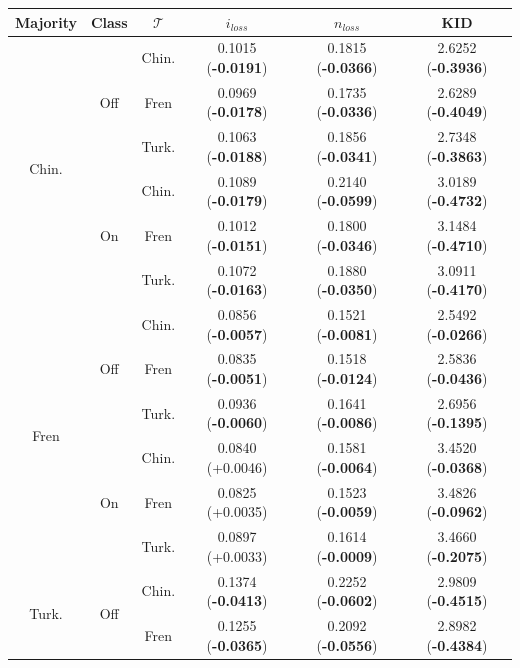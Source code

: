%
%
\begin{table}[]
\centering
\begin{tabular}{c|c|c|c|c|c}
    \textbf{Majority} & \textbf{Class} & \textbf{$\mathcal{T}$} & \textbf{$i_{loss}$} & \textbf{$n_{loss}$} & \textbf{KID} \\
    \toprule
\multirow{6}{*}{Chin.} & \multirow{3}{*}{Off} & Chin.    & 0.1015 (\textbf{-0.0191})       & 0.1815 (\textbf{-0.0366})       & 2.6252 (\textbf{-0.3936})  \\
 &  &Fren     & 0.0969 (\textbf{-0.0178})       & 0.1735 (\textbf{-0.0336})       & 2.6289 (\textbf{-0.4049})   \\
 &  & Turk.    & 0.1063 (\textbf{-0.0188})       & 0.1856 (\textbf{-0.0341})       & 2.7348 (\textbf{-0.3863}) \\
\hhline{~-----}
 & \multirow{3}{*}{On} &Chin.    & 0.1089 (\textbf{-0.0179})       & 0.2140 (\textbf{-0.0599})       & 3.0189 (\textbf{-0.4732}) \\
 &  & Fren     & 0.1012 (\textbf{-0.0151})       & 0.1800 (\textbf{-0.0346})       & 3.1484 (\textbf{-0.4710})  \\
 &  & Turk.    & 0.1072 (\textbf{-0.0163})       & 0.1880 (\textbf{-0.0350})       & 3.0911 (\textbf{-0.4170}) \\
\midrule
\multirow{6}{*}{Fren} & \multirow{3}{*}{Off} & Chin.    & 0.0856 (\textbf{-0.0057})       & 0.1521 (\textbf{-0.0081})       & 2.5492 (\textbf{-0.0266})  \\
 &  & Fren     & 0.0835 (\textbf{-0.0051})       & 0.1518 (\textbf{-0.0124})       & 2.5836 (\textbf{-0.0436})   \\
 &  & Turk.    & 0.0936 (\textbf{-0.0060})       & 0.1641 (\textbf{-0.0086})       & 2.6956 (\textbf{-0.1395})    \\
\hhline{~-----}
 & \multirow{3}{*}{On} & Chin.    & 0.0840 (+0.0046)       & 0.1581 (\textbf{-0.0064})       & 3.4520 (\textbf{-0.0368})  \\
 &  & Fren     & 0.0825 (+0.0035)       & 0.1523 (\textbf{-0.0059})       & 3.4826 (\textbf{-0.0962})   \\
 &  & Turk.    & 0.0897 (+0.0033)       & 0.1614 (\textbf{-0.0009})       & 3.4660 (\textbf{-0.2075})    \\
\midrule
\multirow{6}{*}{Turk.} & \multirow{3}{*}{Off} & Chin.    & 0.1374 (\textbf{-0.0413})       & 0.2252 (\textbf{-0.0602})       & 2.9809 (\textbf{-0.4515})    \\
 &  & Fren     & 0.1255 (\textbf{-0.0365})       & 0.2092 (\textbf{-0.0556})       & 2.8982 (\textbf{-0.4384})   \\

\end{tabular}
\end{table}

